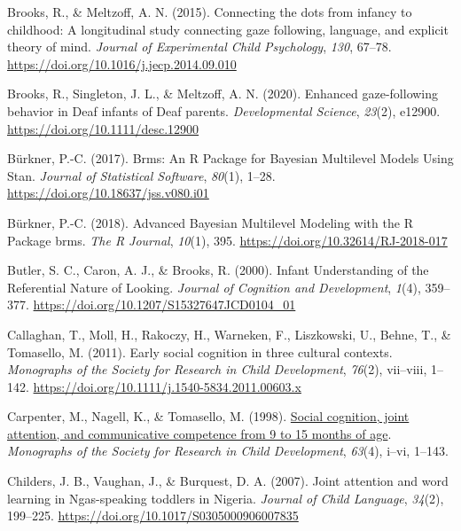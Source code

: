 \documentclass[
  man,floatsintext]{apa7}
\newlength{\cslhangindent}
\newenvironment{CSLReferences}[2] %
 {\begin{list}{}{%
  \setlength{\itemindent}{0pt}
  \setlength{\leftmargin}{0pt}
  \setlength{\parsep}{0pt}
  \ifodd #1
   \setlength{\leftmargin}{\cslhangindent}
   \setlength{\itemindent}{-1\cslhangindent}
  \fi
  \setlength{\itemsep}{#2\baselineskip}}}
 {\end{list}}
\begin{document}
\begin{CSLReferences}{1}{0}
Brooks, R., \& Meltzoff, A. N. (2015). Connecting the dots from infancy to childhood: {A} longitudinal study connecting gaze following, language, and explicit theory of mind. \emph{Journal of Experimental Child Psychology}, \emph{130}, 67--78. \url{https://doi.org/10.1016/j.jecp.2014.09.010}

Brooks, R., Singleton, J. L., \& Meltzoff, A. N. (2020). Enhanced gaze-following behavior in {Deaf} infants of {Deaf} parents. \emph{Developmental Science}, \emph{23}(2), e12900. \url{https://doi.org/10.1111/desc.12900}

Bürkner, P.-C. (2017). Brms: {An R Package} for {Bayesian Multilevel Models Using Stan}. \emph{Journal of Statistical Software}, \emph{80}(1), 1--28. \url{https://doi.org/10.18637/jss.v080.i01}

Bürkner, P.-C. (2018). Advanced {Bayesian Multilevel Modeling} with the {R Package} brms. \emph{The R Journal}, \emph{10}(1), 395. \url{https://doi.org/10.32614/RJ-2018-017}

Butler, S. C., Caron, A. J., \& Brooks, R. (2000). Infant {Understanding} of the {Referential Nature} of {Looking}. \emph{Journal of Cognition and Development}, \emph{1}(4), 359--377. \url{https://doi.org/10.1207/S15327647JCD0104_01}

Callaghan, T., Moll, H., Rakoczy, H., Warneken, F., Liszkowski, U., Behne, T., \& Tomasello, M. (2011). Early social cognition in three cultural contexts. \emph{Monographs of the Society for Research in Child Development}, \emph{76}(2), vii--viii, 1--142. \url{https://doi.org/10.1111/j.1540-5834.2011.00603.x}

Carpenter, M., Nagell, K., \& Tomasello, M. (1998). \href{https://www.ncbi.nlm.nih.gov/pubmed/9835078}{Social cognition, joint attention, and communicative competence from 9 to 15 months of age}. \emph{Monographs of the Society for Research in Child Development}, \emph{63}(4), i--vi, 1--143.

Childers, J. B., Vaughan, J., \& Burquest, D. A. (2007). Joint attention and word learning in {Ngas-speaking} toddlers in {Nigeria}. \emph{Journal of Child Language}, \emph{34}(2), 199--225. \url{https://doi.org/10.1017/S0305000906007835}


\end{CSLReferences}
\end{document}
